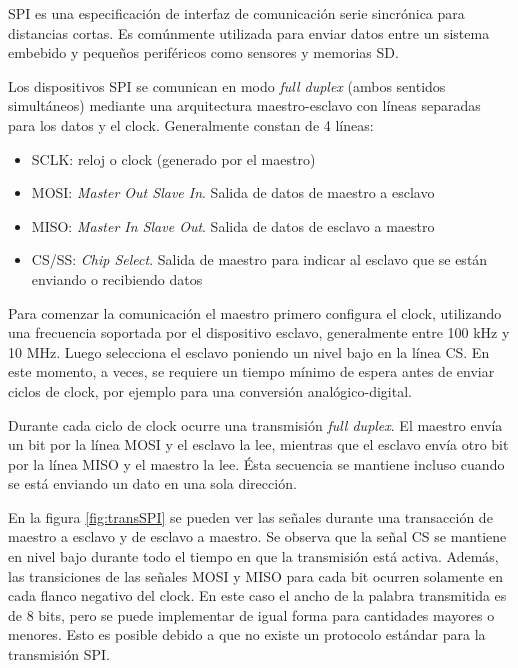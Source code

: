 SPI es una especificación de interfaz de comunicación serie sincrónica para distancias cortas. Es comúnmente utilizada para enviar datos entre un sistema embebido y pequeños periféricos como sensores y memorias SD.

Los dispositivos SPI se comunican en modo \textit{full duplex} (ambos sentidos simultáneos) mediante una arquitectura maestro-esclavo con líneas separadas para los datos y el clock. Generalmente constan de 4 líneas:

\begin{itemize}
\item SCLK: reloj o clock (generado por el maestro)
\item MOSI: \textit{Master Out Slave In}. Salida de datos de maestro a esclavo
\item MISO: \textit{Master In Slave Out}. Salida de datos de esclavo a maestro
\item CS/SS: \textit{Chip Select}. Salida de maestro para indicar al esclavo que se están enviando o recibiendo datos
\end{itemize}

Para comenzar la comunicación el maestro primero configura el clock, utilizando una frecuencia soportada por el dispositivo esclavo, generalmente entre 100 kHz y 10 MHz. Luego selecciona el esclavo poniendo un nivel bajo en la línea CS. En este momento, a veces, se requiere un tiempo mínimo de espera antes de enviar ciclos de clock, por ejemplo para una conversión analógico-digital.

Durante cada ciclo de clock ocurre una transmisión \textit{full duplex}. El maestro envía un bit por la línea MOSI y el esclavo la lee, mientras que el esclavo envía otro bit por la línea MISO y el maestro la lee. Ésta secuencia se mantiene incluso cuando se está enviando un dato en una sola dirección.

En la figura \ref{fig:transSPI} se pueden ver las señales durante una transacción de maestro a esclavo y de esclavo a maestro. Se observa que la señal CS se mantiene en nivel bajo durante todo el tiempo en que la transmisión está activa. Además, las transiciones de las señales MOSI y MISO para cada bit ocurren solamente en cada flanco negativo del clock. En este caso el ancho de la palabra transmitida es de 8 bits, pero se puede implementar de igual forma para cantidades mayores o menores. Esto es posible debido a que no existe un protocolo estándar para la transmisión SPI.

